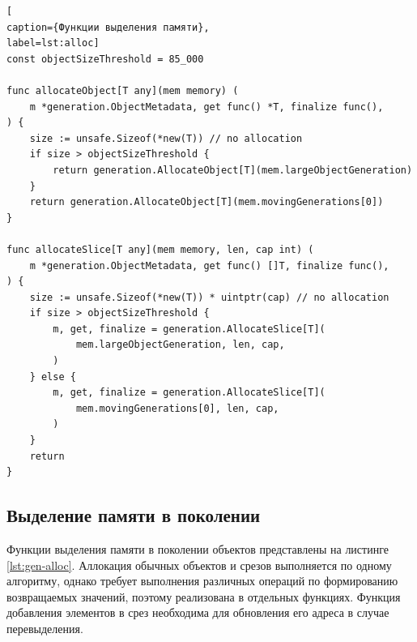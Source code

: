\begin{lstlisting}[
caption={Функции выделения памяти},
label=lst:alloc]
const objectSizeThreshold = 85_000

func allocateObject[T any](mem memory) (
	m *generation.ObjectMetadata, get func() *T, finalize func(),
) {
	size := unsafe.Sizeof(*new(T)) // no allocation
	if size > objectSizeThreshold {
		return generation.AllocateObject[T](mem.largeObjectGeneration)
	}
	return generation.AllocateObject[T](mem.movingGenerations[0])
}

func allocateSlice[T any](mem memory, len, cap int) (
	m *generation.ObjectMetadata, get func() []T, finalize func(),
) {
	size := unsafe.Sizeof(*new(T)) * uintptr(cap) // no allocation
	if size > objectSizeThreshold {
		m, get, finalize = generation.AllocateSlice[T](
			mem.largeObjectGeneration, len, cap,
		)
	} else {
		m, get, finalize = generation.AllocateSlice[T](
			mem.movingGenerations[0], len, cap,
		)
	}
	return
}
\end{lstlisting}



\subsection{Выделение памяти в поколении}

Функции выделения памяти в поколении объектов представлены на листинге \ref{lst:gen-alloc}. Аллокация обычных объектов и срезов выполняется по одному алгоритму, однако требует выполнения различных операций по формированию возвращаемых значений, поэтому реализована в отдельных функциях. Функция добавления элементов в срез необходима для обновления его адреса в случае перевыделения.

